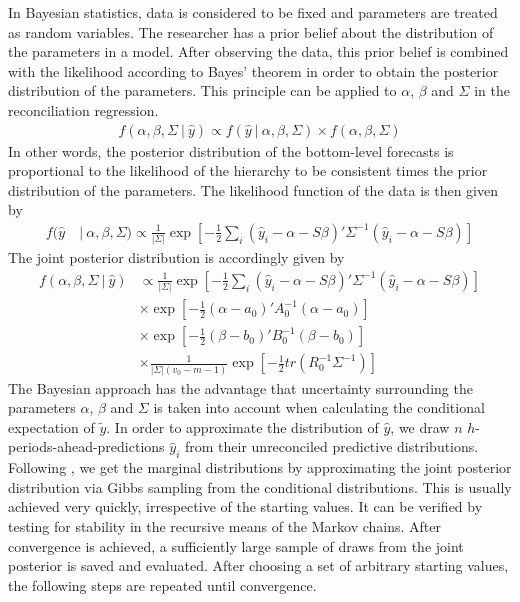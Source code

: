 \documentclass[a4paper,fleqn,11pt]{article}
\begin{document}
In Bayesian statistics, data is considered to be fixed and parameters are treated as random variables. The researcher has a prior belief about the distribution of the parameters in a model. After observing the data, this prior belief is combined with the likelihood according to Bayes' theorem in order to obtain the posterior distribution of the parameters. This principle can be applied to $\alpha$, $\beta$ and $\Sigma$ in the reconciliation regression.
\begin{align}
	f(\alpha, \beta, \Sigma\ |\ \hat{y}) \propto f(\hat{y}\ |\ \alpha, \beta, \Sigma) \times f(\alpha, \beta, \Sigma)
\end{align}
In other words, the posterior distribution of the bottom-level forecasts is proportional to the likelihood of the hierarchy to be consistent times the prior distribution of the parameters. The likelihood function of the data is then given by
\begin{align*}
f(\hat{y}\ &|\ \alpha,\beta,\Sigma) \propto \frac{1}{|\Sigma|} \exp\left[-\frac{1}{2} \sum_i  (\hat{y}_i - \alpha - S\beta)'\Sigma^{-1}(\hat{y}_i - \alpha - S\beta)\right]
\end{align*}
The joint posterior distribution is accordingly given by
\begin{align*}
f(\alpha,\beta,\Sigma\ |\ \hat{y}) & \propto \frac{1}{|\Sigma|} \exp\left[-\frac{1}{2} \sum_i  (\hat{y}_i - \alpha - S\beta)'\Sigma^{-1}(\hat{y}_i - \alpha - S\beta)\right] \\
&\times \exp \left[-\frac{1}{2}(\alpha - a_0)'A_0^{-1}(\alpha - a_0)\right] \\
&\times \exp \left[-\frac{1}{2}(\beta - b_0)'B_0^{-1}(\beta - b_0)\right] \\
&\times \frac{1}{|\Sigma|(v_0 - m - 1)} \exp \left[-\frac{1}{2} tr(R_0^{-1}\Sigma^{-1}) \right]
\end{align*}
The Bayesian approach has the advantage that uncertainty surrounding the parameters $\alpha$, $\beta$ and $\Sigma$ is taken into account when calculating the conditional expectation of $\tilde{y}$. In order to approximate the distribution of $\hat{y}$, we draw $n$ $h$-periods-ahead-predictions $\hat{y}_i$ from their unreconciled predictive distributions. Following \cite{Percy1992}, we get the marginal distributions by approximating the joint posterior distribution via Gibbs sampling from the conditional distributions.  This is usually achieved very quickly, irrespective of the starting values. It can be verified by testing for stability in the recursive means of the Markov chains. After convergence is achieved, a sufficiently large sample of draws from the joint posterior is saved and evaluated. After choosing a set of arbitrary starting values, the following steps are repeated until convergence.\\
\end{document}
